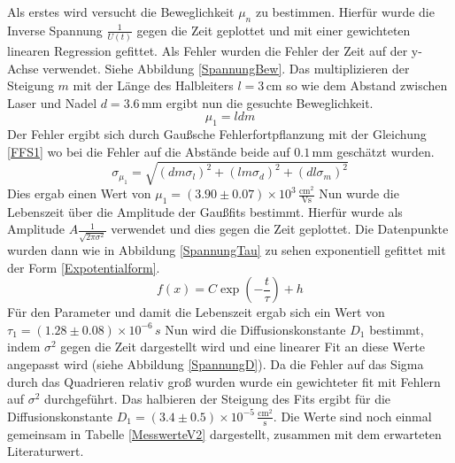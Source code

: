	\FloatBarrier
	Als erstes wird versucht die Beweglichkeit $\mu_n$ zu bestimmen. Hierfür wurde die Inverse Spannung $\frac{1}{U(t)}$ gegen die Zeit geplottet und mit einer gewichteten linearen Regression gefittet. Als Fehler wurden die Fehler der Zeit auf der y-Achse verwendet. Siehe Abbildung \ref{SpannungBew}. Das multiplizieren der Steigung $m$ mit der Länge des Halbleiters $l=3$\,cm so wie dem Abstand zwischen Laser und Nadel $d=3.6$\,mm ergibt nun die gesuchte Beweglichkeit.
	\begin{equation}
		\mu_1=ldm
	\end{equation}
	Der Fehler ergibt sich durch Gaußsche Fehlerfortpflanzung mit der Gleichung \ref{FFS1} wo bei die Fehler auf die Abstände beide auf $0.1$\,mm geschätzt wurden.
	\begin{equation}
		\sigma_{\mu_1}=\sqrt{\left(dm\sigma_l\right)^2+\left(lm\sigma_d\right)^2+\left(dl\sigma_m\right)^2}
		\label{FFS1}
	\end{equation}
	Dies ergab einen Wert von $\mu_1=\left(3.90 \pm 0.07\right) \times 10^{3}\,\frac{\text{cm}^2}{\text{Vs}}$
	Nun wurde die Lebenszeit über die Amplitude der Gaußfits bestimmt. Hierfür wurde als Amplitude $A \frac{1}{\sqrt{2\pi \sigma^2}}$ verwendet und dies gegen die Zeit geplottet. Die Datenpunkte wurden dann wie in Abbildung \ref{SpannungTau} zu sehen exponentiell gefittet mit der Form \ref{Expotentialform}.
	\begin{equation}
		f(x)=C\exp\left(-\frac{t}{\tau}\right)+h
		\label{Expotentialform}
	\end{equation}
	Für den Parameter und damit die Lebenszeit ergab sich ein Wert von $\tau_1=\left(1.28 \pm 0.08\right) \times 10^{-6}\,s$
	Nun wird die Diffusionskonstante $D_1$ bestimmt, indem $\sigma^2$ gegen die Zeit dargestellt wird und eine linearer Fit an diese Werte angepasst wird (siehe Abbildung \ref{SpannungD}). Da die Fehler auf das Sigma durch das Quadrieren relativ groß wurden wurde ein gewichteter fit mit Fehlern auf $\sigma^2$ durchgeführt. Das halbieren der Steigung des Fits ergibt für die Diffusionskonstante  $D_1=\left(3.4 \pm 0.5\right) \times 10^{-5}
	\,\frac{\text{cm}^2}{\text{s}}$.
	Die Werte sind noch einmal gemeinsam in Tabelle \ref{MesswerteV2} dargestellt, zusammen mit dem erwarteten Literaturwert.
	\FloatBarrier
